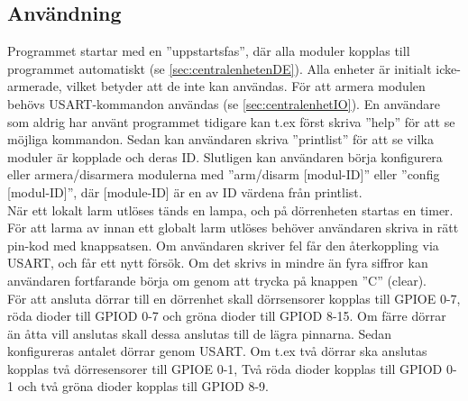 \subsection{Användning}
\label{sec:användning}
Programmet startar med en ''uppstartsfas'', där alla moduler kopplas till programmet automatiskt (se \ref{sec:centralenhetenDE}). Alla enheter är initialt icke-armerade, vilket betyder att de inte kan användas. För att armera modulen behövs USART-kommandon användas (se \ref{sec:centralenhetIO}). En användare som aldrig har använt programmet tidigare kan t.ex först skriva ''help'' för att se möjliga kommandon. Sedan kan användaren skriva ''printlist'' för att se vilka moduler är kopplade och deras ID. Slutligen kan användaren börja konfigurera eller armera/disarmera modulerna med ''arm/disarm [modul-ID]'' eller ''config [modul-ID]'', där [module-ID] är en av ID värdena från printlist. \\

När ett lokalt larm utlöses tänds en lampa, och på dörrenheten startas en timer. För att larma av innan ett globalt larm utlöses behöver användaren skriva in rätt pin-kod med knappsatsen. Om användaren skriver fel får den återkoppling via USART, och får ett nytt försök. Om det skrivs in mindre än fyra siffror kan användaren fortfarande börja om genom att trycka på knappen ''C'' (clear). \\

För att ansluta dörrar till en dörrenhet skall dörrsensorer kopplas till GPIOE 0-7, röda dioder till GPIOD 0-7 och gröna dioder till GPIOD 8-15. Om färre dörrar än åtta vill anslutas skall dessa anslutas till de lägra pinnarna. Sedan konfigureras antalet dörrar genom USART. Om t.ex två dörrar ska anslutas kopplas två dörresensorer till GPIOE 0-1, Två röda dioder kopplas till GPIOD 0-1 och två gröna dioder kopplas till GPIOD 8-9.

